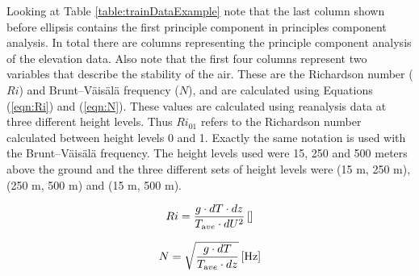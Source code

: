 \begin{table}[h]
    \caption[An example of data structure used with model]{An example of structure of data used to train model. Data points include the derived variables Ri and N, the elevation of the station, direction of wind and relative direction of the wind (that is the direction of the wind relative to center of Iceland), along with some combination of wind speed, pressure and temperature at the different height levels. Finally there are the elevation points around a given station. The example below only shows data derived variables elevation and relative corner.}
    \label{table:trainDataExample}
\end{table}

Looking at Table \ref{table:trainDataExample} note that the last column shown before ellipsis contains the first principle component in principles component analysis. In total there are \nPCA columns representing the principle component analysis of the elevation data. Also note that the first four columns represent two variables that describe the stability of the air. These are the Richardson number ($Ri$)\cite{richardson_number_skybrary} and Brunt–Väisälä frequency\cite{brunt_vaisala_freq_eumtrain} ($N$), and are calculated using Equations (\ref{eqn:Ri}) and (\ref{eqn:N})\cite{mean_gust_HA_HO}. These values are calculated using reanalysis data at three different height levels. Thus $Ri_{01}$ refers to the Richardson number calculated between height levels 0 and 1. Exactly the same notation is used with the Brunt–Väisälä frequency. The height levels used were 15, 250 and 500 meters above the ground and the three different sets of height levels were (15 m, 250 m), (250 m, 500 m) and (15 m, 500 m).

\begin{equation}
    \label{eqn:Ri}
    Ri = \frac{g \cdot dT \cdot dz}{T_{\textrm ave} \cdot dU^2} \, \mathrm{[]}
\end{equation}

\begin{equation}
    \label{eqn:N}
    N = \sqrt{\frac{g \cdot dT }{T_{\textrm ave} \cdot dz}} \, \mathrm{[Hz]}
\end{equation}

